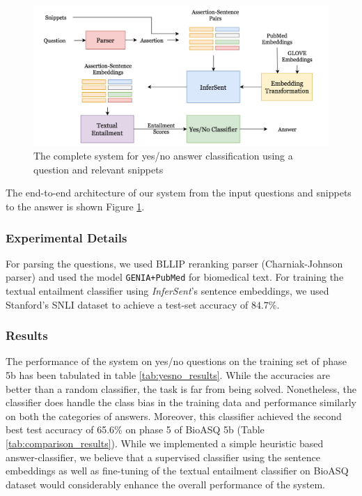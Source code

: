 \documentclass[11pt,a4paper]{article}
\begin{document}
    \begin{figure}[t!]
        \centering
        \includegraphics[scale=0.3]{images/YesNoPipeline.png}
        \caption{The complete system for yes/no answer classification using a question and relevant snippets}
        \label{fig:yesno_pipeline}
    \end{figure}

    The end-to-end architecture of our system from the input questions and snippets to the answer is shown Figure \ref{fig:yesno_pipeline}.

\subsubsection{Experimental Details}

For parsing the questions, we used BLLIP reranking parser \cite{charniak_new1} (Charniak-Johnson parser) %
and used the model \texttt{GENIA+PubMed} for biomedical text. For training the textual entailment classifier using \textit{InferSent}'s sentence embeddings, we used Stanford's SNLI dataset \cite{snli} to achieve a test-set accuracy of $84.7 \%$.

\subsubsection{Results}

The performance of the system on yes/no questions on the training set of phase 5b has been tabulated in table \ref{tab:yesno_results}. While the accuracies are better than a random classifier, the task is far from being solved. Nonetheless, the classifier does handle the class bias in the training data and performance similarly on both the categories of answers. Moreover, this classifier achieved the second best test accuracy of 65.6\% on phase 5 of BioASQ 5b (Table \ref{tab:comparison_results}). While we implemented a simple heuristic based answer-classifier, we believe that a supervised classifier using the sentence embeddings as well as fine-tuning of the textual entailment classifier on BioASQ dataset would considerably enhance the overall performance of the system.
\end{document}
